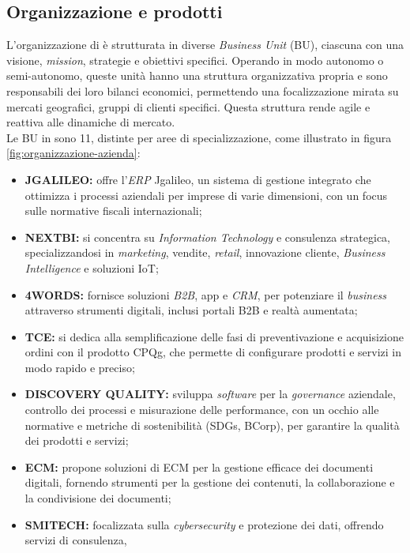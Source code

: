 \subsection{Organizzazione e prodotti}
L'organizzazione di \azienda{} è strutturata in diverse \textit{Business Unit} (BU), ciascuna con una visione, \textit{mission}, strategie e obiettivi specifici. Operando in modo autonomo o semi-autonomo, 
queste unità hanno una struttura organizzativa propria e sono responsabili dei loro bilanci economici, permettendo una focalizzazione mirata su mercati geografici, gruppi di clienti specifici. 
Questa struttura rende \azienda{} agile e reattiva alle dinamiche di mercato. \\
Le BU in \azienda{} sono 11, distinte per aree di specializzazione, come illustrato in figura \ref{fig:organizzazione-azienda}:
\begin{itemize}
\item \textbf{JGALILEO:} offre l’\textit{\gls{ERP}} Jgalileo, un sistema di gestione integrato che ottimizza i processi aziendali per imprese di varie dimensioni, 
con un focus sulle normative fiscali internazionali;
\item \textbf{NEXTBI:} si concentra su \textit{Information Technology} e consulenza strategica, specializzandosi in \textit{marketing}, vendite, \textit{retail}, 
innovazione cliente, \textit{Business Intelligence} e soluzioni \gls{IoT};
\item \textbf{4WORDS:} fornisce soluzioni \textit{\gls{B2B}}, app e \textit{\gls{CRM}}, per potenziare il \textit{business} attraverso strumenti digitali, 
inclusi portali B2B e realtà aumentata;
\item \textbf{TCE:} si dedica alla semplificazione delle fasi di preventivazione e acquisizione ordini con il prodotto \gls{CPQg}, 
che permette di configurare prodotti e servizi in modo rapido e preciso;
\item \textbf{DISCOVERY QUALITY:} sviluppa \textit{software} per la \textit{governance} aziendale, controllo dei processi e misurazione delle performance, 
con un occhio alle normative e metriche di sostenibilità (\gls{SDGs}, \gls{BCorp}), per garantire la qualità dei prodotti e servizi;
\item \textbf{ECM:} propone soluzioni di \gls{ECM} per la gestione efficace dei documenti digitali, fornendo strumenti per la gestione dei contenuti, 
la collaborazione e la condivisione dei documenti;
\item \textbf{SMITECH:} focalizzata sulla \textit{\gls{cybersecurity}} e protezione dei dati, offrendo servizi di consulenza, 

\end{itemize}
